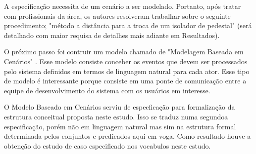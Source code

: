 A especificação necessita de um cenário a ser modelado. Portanto, após tratar com profissionais da área, os autores resolveram trabalhar sobre o seguinte procedimento; "método a distância para a troca de um isolador de pedestal" (será detalhado com maior requisa de detalhes mais adiante em Resultados).

O próximo passo foi contruir um modelo chamado de "Modelagem Baseada em Cenários" \cite{softwareeng}. Esse modelo consiste conceber os eventos que devem ser processados pelo sistema definidos em termos de linguagem natural para cada ator. Esse tipo de modelo é interessante porque consiste em uma ponte de comunicação entre a equipe de desenvolvimento do sistema com os usuários em interesse.     

O Modelo Baseado em Cenários serviu de especficação para formalização da estrutura conceitual proposta neste estudo. Isso se traduz numa segundoa especificação, porém não em linguagem natural mas sim na estrutura formal determinada pelos conjuntos e predicados aqui em voga. Como resultado houve a obtenção do estudo de caso especificado nos vocabulos neste estudo.
